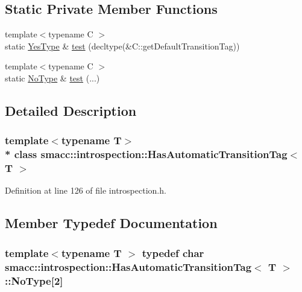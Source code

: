 \subsection*{Static Private Member Functions}
\begin{DoxyCompactItemize}
\item 
{\footnotesize template$<$typename C $>$ }\\static \hyperlink{classsmacc_1_1introspection_1_1HasAutomaticTransitionTag_a750a08a185de0fa20331ba7cfc531dde}{Yes\+Type} \& \hyperlink{classsmacc_1_1introspection_1_1HasAutomaticTransitionTag_a9de2266c38ff1f570674289f32b0faaf}{test} (decltype(\&C\+::get\+Default\+Transition\+Tag))
\item 
{\footnotesize template$<$typename C $>$ }\\static \hyperlink{classsmacc_1_1introspection_1_1HasAutomaticTransitionTag_ab81e7f76862ba064df3fd8e78b3864c4}{No\+Type} \& \hyperlink{classsmacc_1_1introspection_1_1HasAutomaticTransitionTag_aa38a947c16db7a23eefa754ba2c90782}{test} (...)
\end{DoxyCompactItemize}


\subsection{Detailed Description}
\subsubsection*{template$<$typename T$>$\\*
class smacc\+::introspection\+::\+Has\+Automatic\+Transition\+Tag$<$ T $>$}



Definition at line 126 of file introspection.\+h.



\subsection{Member Typedef Documentation}
\subsubsection[{\texorpdfstring{No\+Type}{NoType}}]{\setlength{\rightskip}{0pt plus 5cm}template$<$typename T $>$ typedef char {\bf smacc\+::introspection\+::\+Has\+Automatic\+Transition\+Tag}$<$ T $>$\+::No\+Type\mbox{[}2\mbox{]}\hspace{0.3cm}{\ttfamily [private]}}\hypertarget{classsmacc_1_1introspection_1_1HasAutomaticTransitionTag_ab81e7f76862ba064df3fd8e78b3864c4}{}\label{classsmacc_1_1introspection_1_1HasAutomaticTransitionTag_ab81e7f76862ba064df3fd8e78b3864c4}



